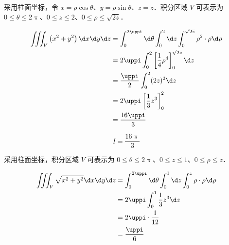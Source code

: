 \begin{solution}
    采用柱面坐标，令 $x=\rho \cos \theta$、$y=\rho \sin \theta$、$z=z$．积分区域 $V$ 可表示为 $0 \leqslant \theta \leqslant 2 \uppi$、$0 \leqslant z \leqslant 2$、$0 \leqslant \rho \leqslant \sqrt{2 z}$．

    \begin{equation}
        \begin{aligned}
            \iiint_{V}\left(x^{2}+y^{2}\right) \d x \d y \d z & = \int_{0}^{2 \uppi} \d \theta \int_{0}^{2} \d z \int_{0}^{\sqrt{2 z}} \rho^{2} \cdot \rho \d \rho \\
                                                              & = 2 \uppi \int_{0}^{2} \left[ \frac{1}{4} \rho^{4} \right]_{0}^{\sqrt{2 z}} \d z                   \\
                                                              & = \frac{\uppi}{2} \int_{0}^{2} (2 z)^{2} \d z                                                      \\
                                                              & = 2 \uppi \left[ \frac{1}{3} z^3 \right]_{0}^{2}                                                   \\
                                                              & = \frac{16 \uppi}{3} \label{eq:I1}
        \end{aligned}
    \end{equation}

    \begin{equation}
        I = \boxed{\frac{16 \uppi}{3}}
    \end{equation}

    采用柱面坐标，积分区域 $V$ 可表示为 $0 \leqslant \theta \leqslant 2 \uppi$、$0 \leqslant z \leqslant 1$、$0 \leqslant \rho \leqslant z$．

    \begin{equation}
        \begin{aligned}
            \iiint_{V} \sqrt{x^{2}+y^{2}} \d x \d y \d z & = \int_{0}^{2 \uppi} \d \theta \int_{0}^{1} \d z \int_{0}^{z} \rho \cdot \rho \d \rho \\
                                                         & = 2 \uppi \int_{0}^{1} \frac{1}{3} z^{3} \d z                                         \\
                                                         & = 2 \uppi \cdot \frac{1}{12}                                                          \\
                                                         & = \frac{\uppi}{6} \label{eq:I2}
        \end{aligned}
    \end{equation}


\end{solution}
